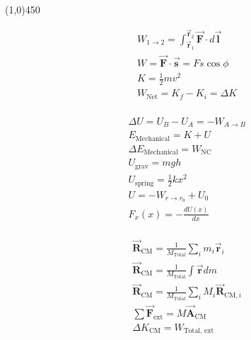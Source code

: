 \documentclass[9pt,letterpaper]{article}
\newcommand{\vect}[1]{\vec{\boldsymbol{#1}}}
\begin{document}
\vspace{-0.4in}
\begin{center}
\line(1,0){450}
\end{center}
\vspace{-0.3in}
\hspace{0.3in}
\begin{minipage}[t]{0.3\linewidth}
\begin{align*}
&W_{1\rightarrow 2} = \int_{\vect{r}_{1}}^{\vect{r}_{2}} \vect{F}\cdot d\vect{l}\\
&W=\vect{F}\cdot\vect{s}= Fs\cos{\phi}\\
&K=\frac{1}{2}mv^{2}\\
&W_{\text{Net}}=K_{f}-K_{i}=\Delta K\\
\end{align*}
\end{minipage}
\begin{minipage}[t]{0.3\linewidth}
\hspace{0.4in}
\begin{align*}
&\Delta U = U_{B} - U_{A} = -W_{A\rightarrow B}\\
&E_{\text{Mechanical}} = K +U\\
&\Delta E_{\text{Mechanical}} = W_{\text{NC}}\\
&U_{\text{grav}} = mgh\\
&U_{\text{spring}} = \frac{1}{2}kx^{2}\\
&U = -W_{r\rightarrow r_{0}} +U_{0}\\
&F_{x}(x) =-\frac{dU(x)}{dx}\\
\end{align*}
\end{minipage}
\begin{minipage}[t]{0.3\linewidth}
\hspace{0.4in}
\begin{align*}
&\vect{R}_{\text{CM}}=\frac{1}{M_{\text{Total}}}\sum_{i} m_{i}\vect{r}_{i}\\
&\vect{R}_{\text{CM}}=\frac{1}{M_{\text{Total}}}\int \vect{r}dm\\
&\vect{R}_{\text{CM}}=\frac{1}{M_{\text{Total}}}\sum_{i} M_{i}\vect{R}_{\text{CM},i}\\
&\sum \vect{F}_{\text{ext}}=M\vect{A}_{\text{CM}}\\
&\Delta K_{\text{CM}} = W_{\text{Total, ext}}\\
\end{align*}
\end{minipage}
\end{document}
